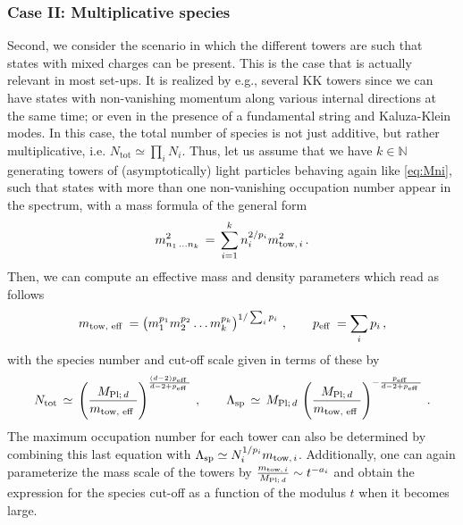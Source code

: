 \subsubsection*{Case II: Multiplicative species}
Second, we consider the scenario in which the different towers are such that states with mixed charges can be present. This is the case that is actually relevant in most set-ups. It is realized by e.g., several KK towers since we can have states with non-vanishing momentum along various internal directions at the same time; or even in the presence of a fundamental string and Kaluza-Klein modes. In this case, the total number of species is not just additive, but rather multiplicative, i.e. $N_{\text{tot}}\simeq \prod_i N_i$. Thus, let us assume that we have $k \in \mathbb{N}$ generating towers of (asymptotically) light particles behaving again like \eqref{eq:Mni}, such that states with more than one non-vanishing occupation number appear in the spectrum, with a mass formula of the general form
%
\begin{equation}\label{eq:massmixedsprectra}
		m_{n_1\,  \ldots  n_k}^2\, =\, \sum_{i=1}^k n_i^{2 / p_i} m_{\text{tow,}\, i}^2\, .
\end{equation}
%
Then, we can compute an effective mass and density parameters which read as follows
%
\begin{equation}
		\label{eq:Meffpeff}
		m_{\text {tow, eff }} =\left(m_1^{p_1} m_2^{p_2} \ldots m_k^{p_k}\right)^{1 / \sum_i p_i}\, , \qquad p_{\text {eff }} =\sum_i p_i\, ,
\end{equation}
%
with the species number and cut-off scale given in terms of these by
%
\begin{equation}
		\label{eq:NtotLQGeff}
		N_{\text{tot}}\, \simeq\, \left( \dfrac{M_{\text{Pl;}\, d}}{ m_{\text {tow, eff }}} \right) ^{\frac{(d-2)p_{\text {eff }}}{d-2+p_{\text {eff }}}}\, , \qquad   \Lambda_{\text{sp}}\, \simeq\, M_{\text{Pl;}\, d} \, \left( \dfrac{M_{\text{Pl;}\, d}}{ m_{\text {tow, eff }}} \right)^{-\frac{p_{\text {eff }}}{d-2+p_{\text {eff }}}} \, .
\end{equation}
%
The maximum occupation number for each tower can also be determined by combining this last equation with $\Lambda_{\text{sp}} \simeq N_i^{1/p_i}m_{\text{tow,}\, i}$. Additionally, one can again parameterize the mass scale of the towers by $\frac{m_{\text{tow,}\, i}}{M_{\text{Pl;}\, d}} \sim t^{-a_i}$ and obtain the expression for the species cut-off as a function of the modulus $t$ when it becomes large.
	
